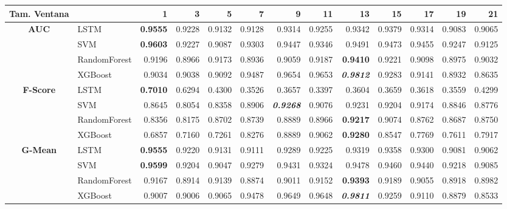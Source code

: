 \begin{table}[H]
	\centering
	\begin{adjustbox}{max width=12cm}
		\begin{tabular}{|c|l|r|r|r|r|r|r|r|r|r|r|r|}
			\hline
			\textbf{Tam. Ventana}&         &      1  &      3  &      5  &      7  &      9  &      11 &      13 &      15 &      17 &      19 &      21 \\
			\hline
			\textbf{AUC} & LSTM &  \textbf{0.9555} &  0.9228 &  0.9132 &  0.9128 &  0.9314 &  0.9255 &  0.9342 &  0.9379 &  0.9314 &  0.9083 &  0.9065 \\
			& SVM &  \textbf{0.9603} &  0.9227 &  0.9087 &  0.9303 &  0.9447 &  0.9346 &  0.9491 &  0.9473 &  0.9455 &  0.9247 &  0.9125 \\
			& RandomForest &  0.9196 &  0.8966 &  0.9173 &  0.8936 &  0.9059 &  0.9187 &  \textbf{0.9410} &  0.9221 &  0.9098 &  0.8975 &  0.9032 \\
			& XGBoost &  0.9034 &  0.9038 &  0.9092 &  0.9487 &  0.9654 &  0.9653 &  \textit{\textbf{0.9812}} &  0.9283 &  0.9141 &  0.8932 &  0.8635 \\
			\hline
			\textbf{F-Score} & LSTM &  \textbf{0.7010} &  0.6294 &  0.4300 &  0.3526 &  0.3657 &  0.3397 &  0.3604 &  0.3659 &  0.3618 &  0.3559 &  0.4299 \\
			& SVM &  0.8645 &  0.8054 &  0.8358 &  0.8906 &  \textit{\textbf{0.9268}} &  0.9076 &  0.9231 &  0.9204 &  0.9174 &  0.8846 &  0.8776 \\
			& RandomForest &  0.8356 &  0.8175 &  0.8702 &  0.8739 &  0.8889 &  0.8966 &  \textbf{0.9217} &  0.9074 &  0.8762 &  0.8687 &  0.8750 \\
			& XGBoost &  0.6857 &  0.7160 &  0.7261 &  0.8276 &  0.8889 &  0.9062 &  \textbf{0.9280} &  0.8547 &  0.7769 &  0.7611 &  0.7917 \\
			\hline
			\textbf{G-Mean} & LSTM &  \textbf{0.9555} &  0.9220 &  0.9131 &  0.9111 &  0.9289 &  0.9225 &  0.9319 &  0.9358 &  0.9300 &  0.9081 &  0.9062 \\
			& SVM &  \textbf{0.9599} &  0.9204 &  0.9047 &  0.9279 &  0.9431 &  0.9324 &  0.9478 &  0.9460 &  0.9440 &  0.9218 &  0.9085 \\
			& RandomForest &  0.9167 &  0.8914 &  0.9139 &  0.8874 &  0.9011 &  0.9152 &  \textbf{0.9393} &  0.9189 &  0.9055 &  0.8918 &  0.8982 \\
			& XGBoost &  0.9007 &  0.9006 &  0.9065 &  0.9478 &  0.9649 &  0.9648 &  \textit{\textbf{0.9811}}&  0.9259 &  0.9110 &  0.8879 &  0.8533 \\

\end{tabular}
\end{adjustbox}
\end{table}
